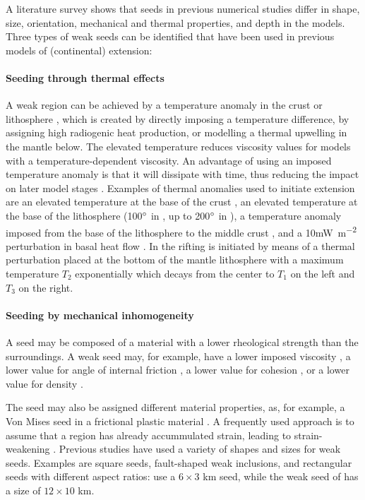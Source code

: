 A literature survey shows that seeds in previous numerical studies differ in shape, size, 
orientation, mechanical and thermal properties, and depth in the models. 
Three types of weak seeds can be identified that have been 
used in previous models of (continental) extension:

\paragraph{Seeding through thermal effects}
A weak region can be achieved by a temperature anomaly in the crust or lithosphere \cite{bupo99},
which is created by directly imposing a temperature difference, by assigning high radiogenic 
heat production, or modelling a thermal upwelling in the mantle below.
The elevated temperature reduces viscosity values for models with a temperature-dependent 
viscosity.
An advantage of using an imposed temperature anomaly is that it will dissipate with time, 
thus reducing the impact on later model stages \cite{hani03}.
Examples of thermal anomalies used to initiate extension are
an elevated temperature at the base of the crust \cite{hani03},
an elevated temperature at the base of the lithosphere 
(100$\rm^\circ$ in \cite{bupo01}, 
up to 200$\rm^\circ$ in \cite{brau13}),
a temperature anomaly imposed from the base of the lithosphere to the middle
crust \cite{chld92},
and a 10\si{\milli\watt\per\square\metre} perturbation in basal heat flow \cite{frbr01}.
In \cite{bupo01} the rifting is initiated by means of 
a thermal perturbation placed at the bottom of the mantle lithosphere with a maximum temperature $T_{2}$ 
exponentially which decays from the center to $T_{1}$ on the left and $T_{3}$ on the right. 

\paragraph{Seeding by mechanical inhomogeneity} 
A seed may be composed of a material with a lower rheological strength than the 
surroundings.
A weak seed may, for example, have a lower imposed viscosity 
\cite{lemm08,kaus10,mishin11}, 
a lower value for angle of internal friction 
\cite{pybf02,kapo06,thie11,grpy13,chbe13}, 
a lower value for cohesion \cite{alht11}, or a lower value for density \cite{tibb08}. 

The seed may also be assigned different material properties, as, for example,
a Von Mises seed in a frictional plastic material \cite{hube07}.
A frequently used approach is to assume that a region has already accummulated
strain, leading to strain-weakening 
\cite{labp00,hubb05,peso08,alht11,alht12,knak13,alhf13}. 
Previous studies have used a variety of shapes and sizes for weak seeds. 
Examples are square seeds, fault-shaped weak inclusions, and rectangular seeds with different 
aspect ratios: \cite{hubb05} use a $6\times 3$ km seed, while the weak seed 
of \cite{hube07} has a size of $12\times 10$ km. 

